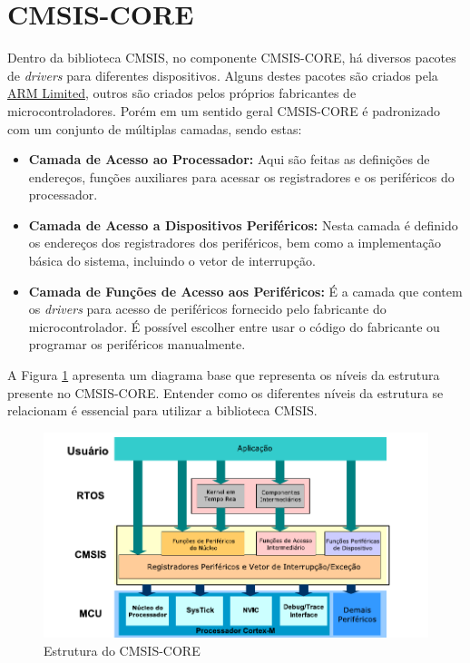 \section{CMSIS-CORE}

Dentro da biblioteca CMSIS, no componente CMSIS-CORE, há diversos pacotes de \emph{drivers} para diferentes dispositivos. Alguns destes pacotes são criados pela \href{http://infocenter.arm.com/help/index.jsp}{ARM Limited}, outros são criados pelos próprios fabricantes de microcontroladores.  Porém em um sentido geral CMSIS-CORE é padronizado com um conjunto de múltiplas camadas, sendo estas:

\begin{itemize}
	\item \textbf{Camada de Acesso ao Processador:} Aqui são feitas as definições de endereços, funções auxiliares para acessar os registradores e os periféricos do processador.
	
	\item \textbf{Camada de Acesso a Dispositivos Periféricos:} Nesta camada é definido os endereços dos registradores dos periféricos, bem como a implementação básica do sistema, incluindo o vetor de interrupção.
	
	\item \textbf{Camada de Funções de Acesso aos Periféricos:} É a camada que contem os \emph{drivers} para acesso de periféricos fornecido pelo fabricante do microcontrolador. É possível escolher entre usar o código do fabricante ou programar os periféricos manualmente. 
\end{itemize}

A Figura \ref{fig:CMSIS-CORE} apresenta um diagrama base que representa os níveis da estrutura presente no CMSIS-CORE. Entender como os diferentes níveis da estrutura se relacionam é essencial para  utilizar a biblioteca CMSIS.

\begin{figure}[!h]
	\centering
	\includegraphics[width=1\textwidth] {figuras/CMSIS-CoreStructure.pdf}
	\caption{Estrutura do CMSIS-CORE \cite{CMSIS}}
	\label{fig:CMSIS-CORE}
\end{figure}


